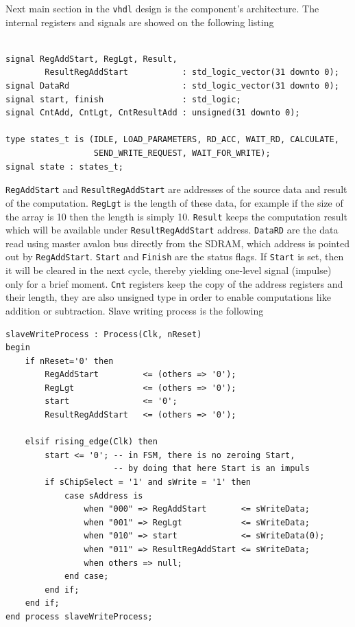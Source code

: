 Next main section in the \verb|vhdl| design is the component's architecture. The internal registers and signals are showed on the following listing
\begin{verbatim}

signal RegAddStart, RegLgt, Result, 
        ResultRegAddStart           : std_logic_vector(31 downto 0);
signal DataRd                       : std_logic_vector(31 downto 0);
signal start, finish                : std_logic;
signal CntAdd, CntLgt, CntResultAdd : unsigned(31 downto 0);
	
type states_t is (IDLE, LOAD_PARAMETERS, RD_ACC, WAIT_RD, CALCULATE, 
                  SEND_WRITE_REQUEST, WAIT_FOR_WRITE);
signal state : states_t;
\end{verbatim}
\verb|RegAddStart| and \verb|ResultRegAddStart| are addresses of the source data and result of the computation. \verb|RegLgt| is the length of these data, for example if the size of the array is 10 then the length is simply 10. \verb|Result| keeps the computation result which will be available under \verb|ResultRegAddStart| address. \verb|DataRD| are the data read using master avalon bus directly from the SDRAM, which address is pointed out by \verb|RegAddStart|. \verb|Start| and \verb|Finish| are the status flags. If \verb|Start| is set, then it will be cleared in the next cycle, thereby yielding one-level signal (impulse) only for a brief moment. \verb|Cnt| registers keep the copy of the address registers and their length, they are also unsigned type in order to enable computations like addition or subtraction. Slave writing process is the following
\begin{verbatim}
slaveWriteProcess : Process(Clk, nReset) 
begin
    if nReset='0' then
        RegAddStart         <= (others => '0');
        RegLgt              <= (others => '0');
        start               <= '0';
        ResultRegAddStart   <= (others => '0');
    
    elsif rising_edge(Clk) then
        start <= '0'; -- in FSM, there is no zeroing Start,
                      -- by doing that here Start is an impuls
        if sChipSelect = '1' and sWrite = '1' then
            case sAddress is
                when "000" => RegAddStart       <= sWriteData; 
                when "001" => RegLgt            <= sWriteData; 
                when "010" => start             <= sWriteData(0); 
                when "011" => ResultRegAddStart <= sWriteData;
                when others => null;
            end case;
        end if;
    end if;
end process slaveWriteProcess;
\end{verbatim}
